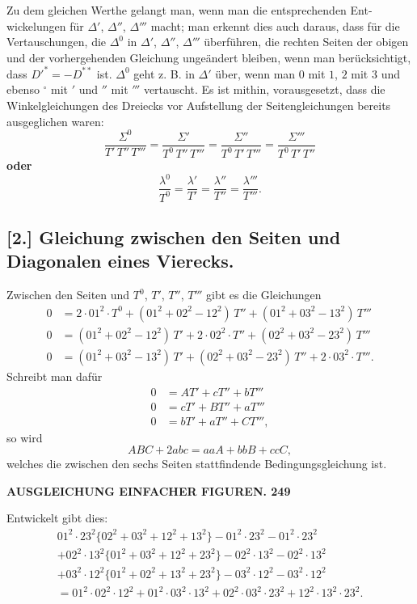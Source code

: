 \documentclass[12pt,a4paper]{article}
\theoremstyle{plain}
\theoremstyle{definition}
\theoremstyle{remark}
\begin{document}
Zu dem gleichen Werthe gelangt man, wenn man die entsprechenden Ent-
wickelungen f\"ur $\Delta'$, $\Delta''$, $\Delta'''$ macht; man erkennt dies auch daraus, dass f\"ur
die Vertauschungen, die $\Delta^0$ in $\Delta'$, $\Delta''$, $\Delta'''$ \"uberf\"uhren, die rechten Seiten der
obigen und der vorhergehenden Gleichung unge\"andert bleiben, wenn man
ber\"ucksichtigt, dass $D'^{*} = -D^{**}$ ist. $\Delta^0$ geht z. B. in $\Delta'$ \"uber, wenn man
$0$ mit $1$, $2$ mit $3$ und ebenso $^{\circ}$ mit $'$ und $''$ mit $'''$ vertauscht. Es ist mithin,
vorausgesetzt, dass die Winkelgleichungen des Dreiecks vor Aufstellung der
Seitengleichungen bereits ausgeglichen waren:
\[
\frac{\Sigma^0}{T'\,T''\,T'''} = \frac{\Sigma'}{T^0\,T''\,T'''} = \frac{\Sigma''}{T^0\,T'\,T'''} = \frac{\Sigma'''}{T^0\,T'\,T''}
\]
\textbf{oder}
\[
\frac{\lambda^0}{T^0} = \frac{\lambda'}{T'} = \frac{\lambda''}{T''} = \frac{\lambda'''}{T'''}.
\]

\subsection*{[2.] Gleichung zwischen den Seiten und Diagonalen eines Vierecks.}

Zwischen den Seiten und $T^0$, $T'$, $T''$, $T'''$ gibt es die Gleichungen
\begin{align*}
0 &= 2 \cdot 01^2 \cdot T^0 + (01^2 + 02^2 - 12^2)\,T'' + (01^2 + 03^2 - 13^2)\,T''' \\
0 &= (01^2 + 02^2 - 12^2)\,T' + 2 \cdot 02^2 \cdot T'' + (02^2 + 03^2 - 23^2)\,T''' \\
0 &= (01^2 + 03^2 - 13^2)\,T' + (02^2 + 03^2 - 23^2)\,T'' + 2 \cdot 03^2 \cdot T'''.
\end{align*}
Schreibt man daf\"ur
\begin{align*}
0 &= AT' + cT'' + bT''' \\
0 &= cT' + BT'' + aT''' \\
0 &= bT' + aT'' + CT''',
\end{align*}
so wird
\[
ABC + 2abc = aaA + bbB + ccC,
\]
welches die zwischen den sechs Seiten stattfindende Bedingungsgleichung ist.


\newpage

\noindent\textbf{AUSGLEICHUNG EINFACHER FIGUREN. 249}

Entwickelt gibt dies:
\begin{multline*}
01^2 \cdot 23^2 \{02^2 + 03^2 + 12^2 + 13^2\} - 01^2 \cdot 23^2 - 01^2 \cdot 23^2 \\
+ 02^2 \cdot 13^2 \{01^2 + 03^2 + 12^2 + 23^2\} - 02^2 \cdot 13^2 - 02^2 \cdot 13^2 \\
+ 03^2 \cdot 12^2 \{01^2 + 02^2 + 13^2 + 23^2\} - 03^2 \cdot 12^2 - 03^2 \cdot 12^2 \\
= 01^2 \cdot 02^2 \cdot 12^2 + 01^2 \cdot 03^2 \cdot 13^2 + 02^2 \cdot 03^2 \cdot 23^2 + 12^2 \cdot 13^2 \cdot 23^2.
\end{multline*}
\end{document}
